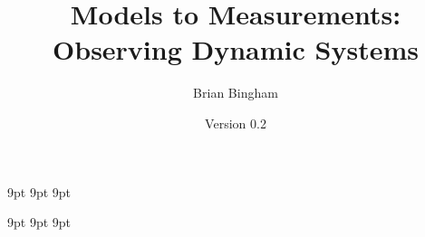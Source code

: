 \documentclass[11pt]{book}
\begin{document}
\newif\ifsolutions

\graphicspath{{./}{./figs/}}

%

\newcommand{\bmcode}{\begin{lstlisting}[style=myMatStyle]}
\newcommand{\emcode}{\end{lstlisting}}

\newcommand{\SF}{0.2}
\newcommand{\SFb}{0.3}

\newcommand{\FigWidth}{0.7}
\newcommand{\ThisFigWidth}{0.7}

\newcommand{\scaleOneTwo}[2] {\scalebox{#2}}

\graphicspath{{./figs/}}


     {9pt}%
     {9pt}%
     {\itshape}%
     {}%
     {\bfseries}%
     {}%
     {9pt}%
     {}%


\theoremstyle{myex}
\newtheorem{ex}{Exercise}[chapter]

     {9pt}%
     {9pt}%
     {\itshape}%
     {}%
     {\bfseries}%
     {}%
     {9pt}%
     {}%

\theoremstyle{mysoln}
\newtheorem*{soln}{Solution}

\frontmatter
\ifsolutions
\newcommand{\thetitle}{Models to Measurements: \\Observing Dynamic Systems \\ WITH SOLUTIONS}
\else
\newcommand{\thetitle}{Models to Measurements: \\Observing Dynamic Systems}
\fi
\title{\thetitle}
\author{Brian Bingham}
\date{Version 0.2}
\end{document}
